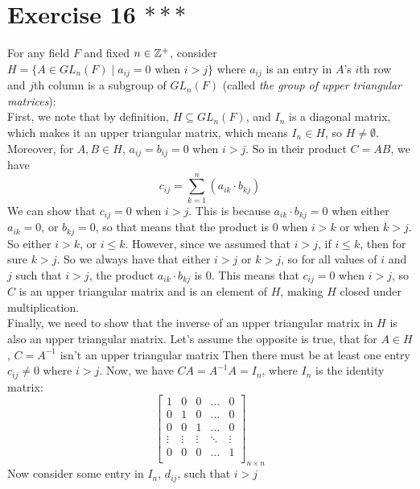 \documentclass[12pt]{article}
\begin{document}
    \section*{Exercise 16 $***$}
    For any field $F$ and fixed $n \in \mathbb{Z}^+$,
    consider $H = \{ A \in GL_n(F) \mid a_{ij} = 0 \text{ when } i > j\}$
    where $a_{ij}$ is an entry in $A$'s $i$th row and $j$th column
    is a subgroup of $GL_n(F)$
    (called \textit{ the group of upper triangular matrices}): \\
    First, we note that by definition, $H \subseteq GL_n(F)$,
    and $I_n$ is a diagonal matrix,
    which makes it an upper triangular matrix,
    which means $I_n \in H$,
    so $H \neq \emptyset$. \\ 
    Moreover, for $A, B \in H$, $a_{ij} = b_{ij} = 0$ when $i > j$.
    So in their product $C = AB$, we have 
    \[ c_{ij} = \sum_{k = 1}^n (a_{ik} \cdot b_{kj}) \]
    We can show that $c_{ij} = 0$ when $i > j$.
    This is because $a_{ik} \cdot b_{kj} = 0$
    when either $a_{ik} = 0$, or $b_{kj} = 0$,
    so that means that the product is 0 when $i > k$
    or when $k > j$.
    So either $i > k$, or $i \leqslant k$.
    However, since we assumed that $i > j$,
    if $i \leqslant k$, then for sure $k > j$.
    So we always have that either $i > j$ or $k > j$,
    so for all values of $i$ and $j$ such that $i > j$,
    the product $a_{ik} \cdot b_{kj}$ is 0.
    This means that $c_{ij} = 0$ when $i > j$,
    so $C$ is an upper triangular matrix and is an element of $H$,
    making $H$ closed under multiplication. \\ 
    Finally, we need to show that the inverse of an upper triangular
    matrix in $H$ is also an upper triangular matrix.
    Let's assume the opposite is true, that for $A \in H$,
    $C = A^{-1}$ isn't an upper triangular matrix
    Then there must be at least one entry $c_{ij} \neq 0$
    where $i > j$.
    Now, we have $CA = A^{-1}A = I_n$,
    where $I_n$ is the identity matrix:
    \[ \begin{bmatrix}
        1 & 0 & 0 & \dots & 0 \\
        0 & 1 & 0 & \dots & 0 \\
        0 & 0 & 1 & \dots & 0 \\
        \vdots & \vdots & \vdots & \ddots & \vdots \\
        0 & 0 & 0 & \dots & 1 \\
    \end{bmatrix}_{n \times n} \]
    Now consider some entry in $I_n$, $d_{ij}$, such that $i > j$
\end{document}
